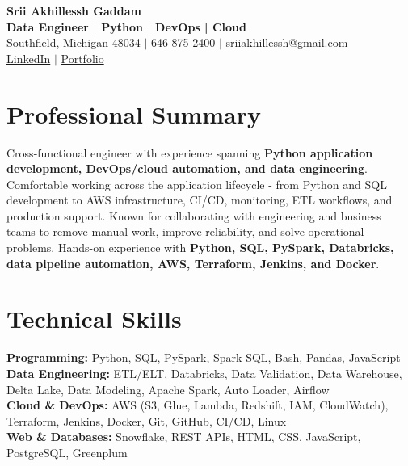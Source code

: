 \documentclass[letterpaper,10pt]{article}
\begin{document}
\fontsize{9.35pt}{10.45pt}\selectfont

\begin{center}
    {\LARGE \textbf{Srii Akhillessh Gaddam}} \\[-1pt]
    \textbf{Data Engineer | Python | DevOps | Cloud} \\[2pt]
    Southfield, Michigan 48034 $|$
    \href{tel:6468752400}{646-875-2400} $|$
    \href{mailto:sriiakhillessh@gmail.com}{sriiakhillessh@gmail.com} \\[1pt]
    \href{https://www.linkedin.com/in/srii-akhiilessh-gaddam-b48668191/}{LinkedIn} $|$
    \href{https://sriiakhillesshg.github.io/portfolio/}{Portfolio}
\end{center}
\vspace{-8pt}

\section{Professional Summary}
\small{Cross-functional engineer with experience spanning \textbf{Python application development, DevOps/cloud automation, and data engineering}. Comfortable working across the application lifecycle - from Python and SQL development to AWS infrastructure, CI/CD, monitoring, ETL workflows, and production support. Known for collaborating with engineering and business teams to remove manual work, improve reliability, and solve operational problems. Hands-on experience with \textbf{Python, SQL, PySpark, Databricks, data pipeline automation, AWS, Terraform, Jenkins, and Docker}.}

\section{Technical Skills}
\small{
\textbf{Programming:} Python, SQL, PySpark, Spark SQL, Bash, Pandas, JavaScript \\
\textbf{Data Engineering:} ETL/ELT, Databricks, Data Validation, Data Warehouse, Delta Lake, Data Modeling, Apache Spark, Auto Loader, Airflow \\
\textbf{Cloud \& DevOps:} AWS (S3, Glue, Lambda, Redshift, IAM, CloudWatch), Terraform, Jenkins, Docker, Git, GitHub, CI/CD, Linux \\
\textbf{Web \& Databases:} Snowflake, REST APIs, HTML, CSS, JavaScript, PostgreSQL, Greenplum
}
\end{document}
